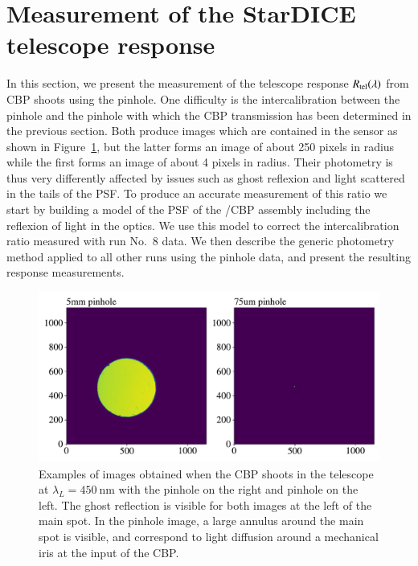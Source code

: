 \section{Measurement of the StarDICE telescope response}
\label{sec:rsd}
\label{sec:sd_datadesc}

In this section, we present the measurement of the \SD telescope response $R_{\mathrm{tel}}(\lambda)$ from CBP shoots using the \spinhole pinhole. One difficulty is the intercalibration between the \spinhole pinhole and the \bpinhole pinhole with which the CBP transmission has been determined in the previous section. Both produce images which are contained in the \SD sensor as shown in Figure~\ref{fig:ccd_examples}, but the latter forms an image of about 250 pixels in radius while the first forms an image of about 4 pixels in radius. Their photometry is thus  very differently affected by issues such as ghost reflexion and light scattered in the tails of the PSF. To produce an accurate measurement of this ratio we start by building a model of the PSF of the \SD/CBP assembly including the reflexion of light in the optics. We use this model to correct the intercalibration ratio measured with run No.~8 data. We then describe the generic photometry method applied to all other runs using the \spinhole pinhole data, and present the resulting response measurements.   

\begin{figure}[h]
    \centering
    \includegraphics[width=\columnwidth]{fig/ccd_examples.pdf}
    \caption{Examples of images obtained when the CBP shoots in the \SD telescope at $\lambda_L=\SI{450}{\nm}$ with the \bpinhole pinhole on the right and \spinhole pinhole on the left. The ghost reflection is visible for both images at the left of the main spot. In the \bpinhole pinhole image, a large annulus around the main spot is visible, and correspond to light diffusion around a mechanical iris at the input of the CBP.}
    \label{fig:ccd_examples}
\end{figure}


